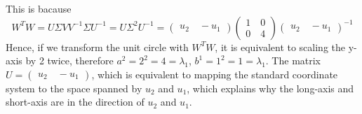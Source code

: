 \documentclass{article}
\begin{document}
    \noindent This is bacause
        \begin{equation*}
            W^TW=U\Sigma V V^{-1}\Sigma U^{-1}=U\Sigma^2 U^{-1}
            =\begin{pmatrix}u_2\quad -u_1\end{pmatrix}
            \begin{pmatrix}1\quad 0\\0\quad 4\end{pmatrix}\begin{pmatrix}u_2\quad -u_1\end{pmatrix}^{-1}
        \end{equation*}
        Hence, if we transform the unit circle with $W^TW$, it is equivalent to scaling the y-axis by 2 twice, 
        therefore $a^2=2^2=4=\lambda_1$, $b^1=1^2=1=\lambda_1$. The matrix $U=\begin{pmatrix}u_2\quad -u_1\end{pmatrix}$,
        which is equivalent to mapping the standard coordinate system to the space spanned by $u_2$ and $u_1$,
        which explains why the long-axis and short-axis are in the direction of $u_2$ and $u_1$.
\end{document}
